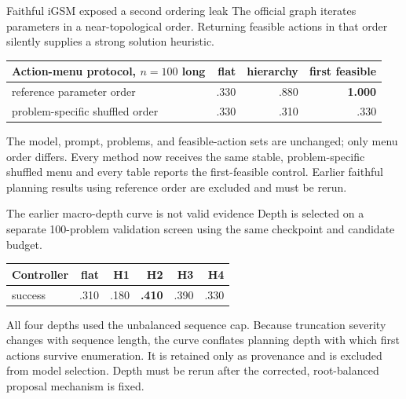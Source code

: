 \documentclass[aspectratio=169,10pt]{beamer}
\newcommand{\good}[1]{\textcolor{cgreen}{\textbf{#1}}}
\newcommand{\bad}[1]{\textcolor{cred}{\textbf{#1}}}
\begin{document}
\begin{frame}{Faithful iGSM exposed a second ordering leak}
\small
The official graph iterates parameters in a near-topological order. Returning
feasible actions in that order silently supplies a strong solution heuristic.

\medskip
\centering
\begin{tabular}{lrrr}
\toprule
Action-menu protocol, $n=100$ long & flat & hierarchy & first feasible\\
\midrule
reference parameter order & .330 & .880 & \bad{1.000}\\
problem-specific shuffled order & .330 & .310 & .330\\
\bottomrule
\end{tabular}

\medskip
The model, prompt, problems, and feasible-action sets are unchanged; only menu
order differs. Every method now receives the same stable, problem-specific
shuffled menu and every table reports the first-feasible control. Earlier
faithful planning results using reference order are excluded and must be rerun.
\end{frame}

\begin{frame}{The earlier macro-depth curve is not valid evidence}
\small
Depth is selected on a separate 100-problem validation screen using the same
checkpoint and candidate budget.

\medskip
\centering
\begin{tabular}{lrrrrr}
\toprule
Controller & flat & H1 & H2 & H3 & H4\\
\midrule
success & .310 & .180 & \good{.410} & .390 & .330\\
\bottomrule
\end{tabular}

\medskip
All four depths used the unbalanced sequence cap. Because truncation severity
changes with sequence length, the curve conflates planning depth with which
first actions survive enumeration. It is retained only as provenance and is
excluded from model selection. Depth must be rerun after the corrected,
root-balanced proposal mechanism is fixed.
\end{frame}
\end{document}
